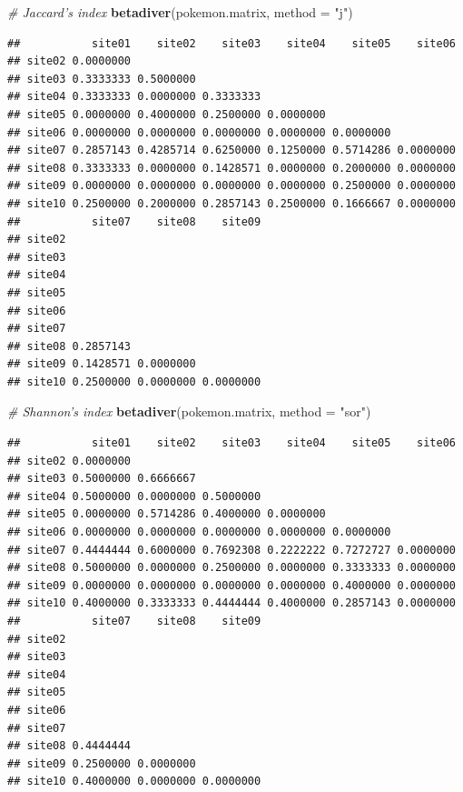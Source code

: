 \documentclass[]{book}
\newenvironment{Shaded}{\begin{snugshade}}{\end{snugshade}}
\newcommand{\KeywordTok}[1]{\textcolor[rgb]{0.13,0.29,0.53}{\textbf{{#1}}}}
\newcommand{\DataTypeTok}[1]{\textcolor[rgb]{0.13,0.29,0.53}{{#1}}}
\newcommand{\StringTok}[1]{\textcolor[rgb]{0.31,0.60,0.02}{{#1}}}
\newcommand{\CommentTok}[1]{\textcolor[rgb]{0.56,0.35,0.01}{\textit{{#1}}}}
\newcommand{\NormalTok}[1]{{#1}}
\theoremstyle{definition}
\theoremstyle{definition}
\theoremstyle{definition}
\theoremstyle{remark}
\begin{document}
\begin{Shaded}
\begin{Highlighting}[]
\CommentTok{# Jaccard's index}
\KeywordTok{betadiver}\NormalTok{(pokemon.matrix, }\DataTypeTok{method =} \StringTok{"j"}\NormalTok{)}
\end{Highlighting}
\end{Shaded}

\begin{verbatim}
##           site01    site02    site03    site04    site05    site06
## site02 0.0000000                                                  
## site03 0.3333333 0.5000000                                        
## site04 0.3333333 0.0000000 0.3333333                              
## site05 0.0000000 0.4000000 0.2500000 0.0000000                    
## site06 0.0000000 0.0000000 0.0000000 0.0000000 0.0000000          
## site07 0.2857143 0.4285714 0.6250000 0.1250000 0.5714286 0.0000000
## site08 0.3333333 0.0000000 0.1428571 0.0000000 0.2000000 0.0000000
## site09 0.0000000 0.0000000 0.0000000 0.0000000 0.2500000 0.0000000
## site10 0.2500000 0.2000000 0.2857143 0.2500000 0.1666667 0.0000000
##           site07    site08    site09
## site02                              
## site03                              
## site04                              
## site05                              
## site06                              
## site07                              
## site08 0.2857143                    
## site09 0.1428571 0.0000000          
## site10 0.2500000 0.0000000 0.0000000
\end{verbatim}

\begin{Shaded}
\begin{Highlighting}[]
\CommentTok{# Shannon's index}
\KeywordTok{betadiver}\NormalTok{(pokemon.matrix, }\DataTypeTok{method =} \StringTok{"sor"}\NormalTok{)}
\end{Highlighting}
\end{Shaded}

\begin{verbatim}
##           site01    site02    site03    site04    site05    site06
## site02 0.0000000                                                  
## site03 0.5000000 0.6666667                                        
## site04 0.5000000 0.0000000 0.5000000                              
## site05 0.0000000 0.5714286 0.4000000 0.0000000                    
## site06 0.0000000 0.0000000 0.0000000 0.0000000 0.0000000          
## site07 0.4444444 0.6000000 0.7692308 0.2222222 0.7272727 0.0000000
## site08 0.5000000 0.0000000 0.2500000 0.0000000 0.3333333 0.0000000
## site09 0.0000000 0.0000000 0.0000000 0.0000000 0.4000000 0.0000000
## site10 0.4000000 0.3333333 0.4444444 0.4000000 0.2857143 0.0000000
##           site07    site08    site09
## site02                              
## site03                              
## site04                              
## site05                              
## site06                              
## site07                              
## site08 0.4444444                    
## site09 0.2500000 0.0000000          
## site10 0.4000000 0.0000000 0.0000000
\end{verbatim}
\end{document}
